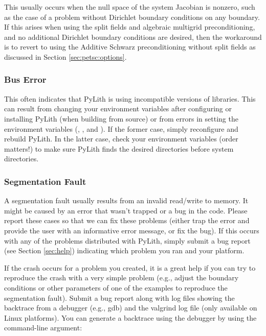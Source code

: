 This usually occurs when the null space of the system Jacobian is
nonzero, such as the case of a problem without Dirichlet boundary
conditions on any boundary. If this arises when using the split fields
and algebraic multigrid preconditioning, and no additional Dirichlet
boundary conditions are desired, then the workaround is to revert
to using the Additive Schwarz preconditioning without split fields
as discussed in Section \vref{sec:petsc:options}.

\subsubsection{Bus Error}

This often indicates that PyLith is using incompatible versions of
libraries. This can result from changing your environment variables
after configuring or installing PyLith (when building from source) or
from errors in setting the environment variables (,
, and ). If the
former case, simply reconfigure and rebuild PyLith. In the latter
case, check your environment variables (order matters!) to make sure
PyLith finds the desired directories before system directories.

\subsubsection{Segmentation Fault}

A segmentation fault usually results from an invalid read/write to
memory. It might be caused by an error that wasn't trapped or a bug in
the code. Please report these cases so that we can fix these problems
(either trap the error and provide the user with an informative error
message, or fix the bug). If this occurs with any of the problems
distributed with PyLith, simply submit a bug report (see Section
\vref{sec:help}) indicating which problem you ran and your
platform.


If the crash occurs for a problem you created, it is a great
help if you can try to reproduce the crash with a very simple problem
(e.g., adjust the boundary conditions or other parameters of one of
the examples to reproduce the segmentation fault). Submit a bug report
along with log files showing the backtrace from a debugger (e.g., gdb)
and the valgrind log file (only available on Linux platforms).  You
can generate a backtrace using the debugger by using the
 command-line argument:

